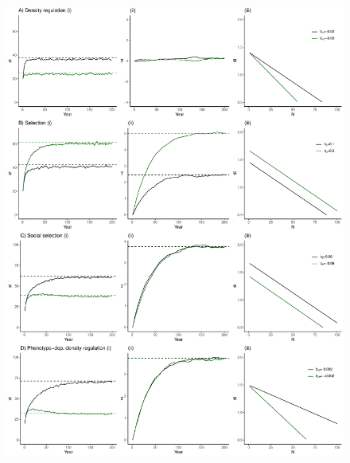 \documentclass{article}
\begin{document}
\newpage
\begin{figure} [H]
	\centering
	\includegraphics[width=12cm, height=16cm]{Figures/Fig3.pdf}

\end{figure}
\end{document}
